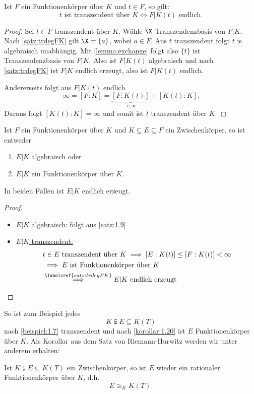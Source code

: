 \begin{korollar}
    Ist $F$ ein Funktionenkörper über $K$ und $t \in F$, so gilt:
    $$ t \text{ ist transzendent über } K \iff F|K(t) \text{ endlich}.$$ 
\end{korollar}
\begin{proof}
    Sei $t \in F$ transzendent über $K$. Wähle $\X$ Transzendenzbasis von $F|K$. Nach \cref{satz:trdegFK} gilt
    $\X = \{a\}$, wobei $a \in F$. Aus $t$ transzendent folgt $t$ is algebraisch unabhängig. Mit \cref{lemma:exchange} folgt also
    $\{t\}$ ist Transzendenzbasis von $F|K$. Also ist $F|K(t)$ algebraisch und nach \cref{satz:trdegFK} ist $F|K$ endlich erzeugt,
    also ist $F|K(t)$ endlich.

    Andererseits folgt aus $F|K(t)$ endlich
    $$ \infty = [F:K] = \underbrace{[F:K(t)]}_{< \infty} + [K(t):K]. $$
    Daraus folgt $[K(t):K] = \infty$ und somit ist $t$ transzendent über $K$.
\end{proof}
\begin{korollar}\label{korollar:1.20}
    Ist $F$ ein Funktionenkörper über $K$ und $K \subseteq E \subseteq F$ ein Zwischenkörper, so ist entweder
    \begin{enumerate}[label=(\arabic*)]
        \item $E|K$ algebraisch oder
        \item $E|K$ ein Funktionenkörper über $K$.
    \end{enumerate}
    In beiden Fällen ist $E|K$ endlich erzeugt.
\end{korollar}
\begin{proof}
    \begin{itemize}[label=]
        \item \underline{$E|K$ algebraisch:}
        folgt aus \cref{satz:1.9}
        \item \underline{$E|K$ transzendent:}
        \begin{align*}
            &t \in E \text{ transzendent über } K \implies [E:K(t)] \leq [F:K(t)] < \infty\\
            &\implies E \text{ ist Funktionenkörper über } K\\
            &\stackrel{\labelcref{satz:trdegFK}}{\implies} E|K \text{ endlich erzeugt}
        \end{align*}
    \end{itemize}
\end{proof}

\begin{bemerkungnr}
    So ist zum Beispiel jedes $$ K \subsetneqq E \subseteq K(T)$$
    nach \cref{beispiel:1.7} transzendent und nach \cref{korollar:1.20} ist $E$ Funktionenkörper
    über $K$. Als Korollar aus dem Satz von Riemann-Hurwitz werden wir unter anderem erhalten:
\end{bemerkungnr}
\begin{theorem}[Lüroth, 1875]
    Ist $K \subsetneqq E \subseteq K(T)$ ein Zwischenkörper, so ist $E$ wieder ein rationaler Funktionenkörper über $K$,
    d.h.
    $$ E \cong_K K(T). $$
\end{theorem}

